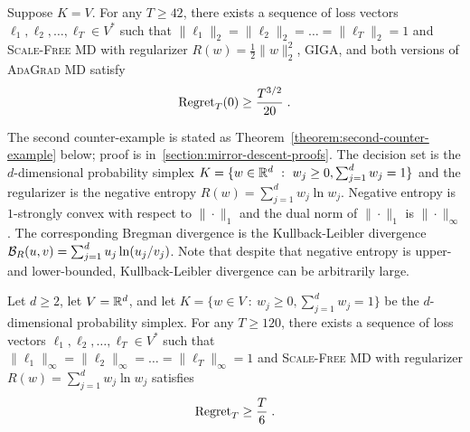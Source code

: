 \begin{theorem}
\label{theorem:first-counter-example}
Suppose $K = V$. For any $T \ge 42$, there exists a sequence of loss vectors
$\ell_1, \ell_2, \dots, \ell_T \in V^*$ such that $\|\ell_1\|_2 = \|\ell_2\|_2
= \dots = \|\ell_T\|_2 = 1$ and \textsc{Scale-Free MD} with
regularizer $R(w) = \frac{1}{2}\|w\|_2^2$, \textsc{GIGA},
and both versions of \textsc{AdaGrad MD} satisfy
$$
\operatorname{Regret}_T(0) \ge \frac{T^{3/2}}{20} \; .
$$
\end{theorem}

The second counter-example is stated as
Theorem~\ref{theorem:second-counter-example} below; proof is
in~\ref{section:mirror-descent-proofs}.  The decision set is the
$d$-dimensional probability simplex $K = \{ w \in \mathbb{R}^d ~:~ w_j \ge 0,
\sum_{j=1}^d w_j = 1 \}$ and the regularizer is the negative entropy $R(w) =
\sum_{j=1}^d w_j \ln w_j$.  Negative entropy is $1$-strongly convex with
respect to $\|\cdot\|_1$ and the dual norm of $\|\cdot\|_1$ is
\mbox{$\|\cdot\|_\infty$}.  The corresponding Bregman divergence is the
Kullback-Leibler divergence $\mathcal{B}_R(u,v) = \sum_{j=1}^d u_j \ln(u_j/v_j)$.
Note that despite that negative entropy is upper- and lower-bounded,
Kullback-Leibler divergence can be arbitrarily large.

\begin{theorem}
\label{theorem:second-counter-example}
Let $d \ge 2$, let $V = \mathbb{R}^d$, and let $K = \{ w \in V ~:~ w_j \ge 0,
\sum_{j=1}^d w_j = 1 \}$ be the $d$-dimensional probability simplex.  For any
$T \ge 120$, there exists a sequence of loss vectors $\ell_1, \ell_2, \dots,
\ell_T \in V^*$ such that $\|\ell_1\|_\infty = \|\ell_2\|_\infty = \dots =
\|\ell_T\|_\infty = 1$ and \textsc{Scale-Free MD} with regularizer
$R(w) = \sum_{j=1}^d w_j \ln w_j$ satisfies
$$
\operatorname{Regret}_T \ge \frac{T}{6} \; .
$$
\end{theorem}
